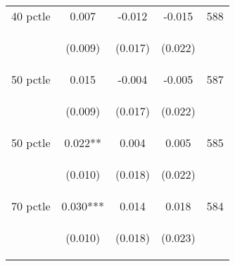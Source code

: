 \begin{tabular}{lcccc}
40 pctle     &  0.007    &    -0.012   &     -0.015  &  588 \\

\vspace{4pt} &  \begin{footnotesize}(0.009)\end{footnotesize}   &
			    \begin{footnotesize}(0.017)\end{footnotesize}   &
			    \begin{footnotesize}(0.022)\end{footnotesize}   &
			     \\          


50 pctle    &  0.015    &   -0.004    &     -0.005  &  587  \\

\vspace{4pt} &  \begin{footnotesize}(0.009)\end{footnotesize}   &
			    \begin{footnotesize}(0.017)\end{footnotesize}   &
			    \begin{footnotesize}(0.022)\end{footnotesize}   &
			     \\          


50 pctle   &  0.022**    &   0.004    &     0.005  &  585  \\

\vspace{4pt}   &  \begin{footnotesize}(0.010)\end{footnotesize}   &
			    \begin{footnotesize}(0.018)\end{footnotesize}   &
			    \begin{footnotesize}(0.022)\end{footnotesize}   &
			     \\          



70 pctle    &  0.030***    &   0.014    &     0.018  &  584  \\

\vspace{4pt} &  \begin{footnotesize}(0.010)\end{footnotesize}   &
			    \begin{footnotesize}(0.018)\end{footnotesize}   &
			    \begin{footnotesize}(0.023)\end{footnotesize}   &
			     \\          




\end{tabular}
